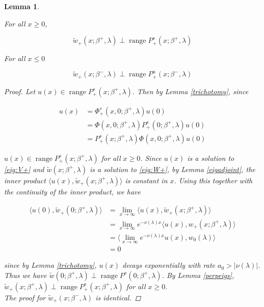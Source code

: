 \documentclass[12pt]{article}
\DeclareMathOperator{\ran}{range}
\newtheorem{lemma}{Lemma}
\begin{document}
\begin{lemma}\label{perpouter}

For all $x \geq 0$,

\begin{equation}
\tilde{w}_+(x; \beta^+, \lambda) \perp \ran P^s_+(x; \beta^+, \lambda)
\end{equation}

For all $x \leq 0$

\begin{equation}
\tilde{w}_+(x; \beta^-, \lambda) \perp \ran P^u_+(x; \beta^-, \lambda)
\end{equation}

\begin{proof}

Let $u(x) \in \ran P^s_+(x; \beta^+, \lambda)$. Then by Lemma \ref{trichotomy}, since

\begin{align*}
u(x) &= \Phi^s_+(x, 0; \beta^+, \lambda)u(0) \\
&= \Phi(x, 0; \beta^+, \lambda) P^s_+(0; \beta^+, \lambda)u(0)\\
&= P^s_+(x; \beta^+, \lambda) \Phi(x, 0; \beta^+, \lambda) u(0)
\end{align*}

$u(x) \in \ran P^s_+(x; \beta^+, \lambda)$ for all $x \geq 0$. Since $u(x)$ is a solution to \eqref{eig:V+} and $\tilde{w}(x; \beta^+, \lambda)$ is a solution to \eqref{eig:W+}, by Lemma \ref{eigadjoint}, the inner product $\langle u(x), \tilde{w}_+(x; \beta^+, \lambda) \rangle$ is constant in $x$. Using this together with the continuity of the inner product, we have

\begin{align*}
\langle u(0), \tilde{w}_+(0; \beta^+, \lambda) \rangle &=
\lim_{x \rightarrow \infty} \langle u(x), \tilde{w}_+(x; \beta^+, \lambda) \rangle\\
 &= \lim_{x \rightarrow \infty} e^{-\nu(\lambda) x} \langle u(x), w_+(x; \beta^+, \lambda) \rangle \\
&= \langle \lim_{x \rightarrow \infty} e^{-\nu(\lambda) x} u(x), w_0(\lambda) \rangle \\
&= 0
\end{align*}

since by Lemma \ref{trichotomy}, $u(x)$ decays exponentially with rate $a_0 > |\nu(\lambda)|$. Thus we have $\tilde{w}(0; \beta^+, \lambda) \perp \ran P^s(0; \beta^+, \lambda)$. By Lemma \ref{perpeigs}, $\tilde{w}_+(x; \beta^+, \lambda) \perp \ran P^s_+(x; \beta^+, \lambda)$ for all $x \geq 0$.\\

The proof for $\tilde{w}_+(x; \beta^-, \lambda)$ is identical.

\end{proof}
\end{lemma} 
\end{document}

